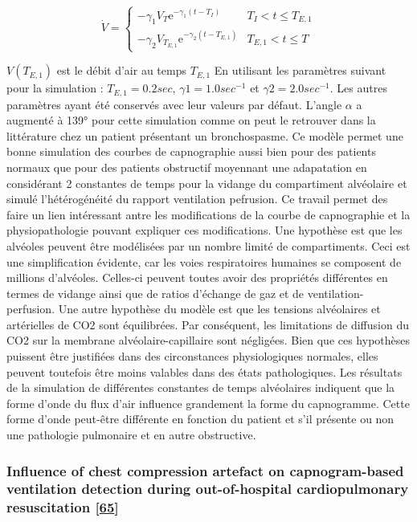 \documentclass[12pt,]{article}
\begin{document}
\[ 
 \dot{V} =     \left\{ \begin{array}{rcl}
         -\gamma_{1}V_{T}\mathrm{e}^{-\gamma_{1}(t-T_{I})} & T_{I}<t\leqslant T_{E,1}
         \\ -\gamma_{2}V_{T_{E,1}}\mathrm{e}^{-\gamma_{2}(t-T_{E,1})} & T_{E,1}<t\leqslant T
                \end{array}\right.
\]

\(V(T_{E,1})\) est le débit d'air au temps \(T_{E,1}\) En utilisant les
paramètres suivant pour la simulation : \(T_{E,1} = 0.2 sec\),
\(\gamma1= 1.0 sec^{-1}\) et \(\gamma2= 2.0 sec^{-1}\). Les autres
paramètres ayant été conservés avec leur valeurs par défaut. L'angle
\(\alpha\) a augmenté à 139° pour cette simulation comme on peut le
retrouver dans la littérature chez un patient présentant un
bronchospasme. Ce modèle permet une bonne simulation des courbes de
capnographie aussi bien pour des patients normaux que pour des patients
obstructif moyennant une adapatation en considérant 2 constantes de
temps pour la vidange du compartiment alvéolaire et simulé
l'hétérogénéité du rapport ventilation pefrusion. Ce travail permet des
faire un lien intéressant antre les modifications de la courbe de
capnographie et la physiopathologie pouvant expliquer ces modifications.
Une hypothèse est que les alvéoles peuvent être modélisées par un nombre
limité de compartiments. Ceci est une simplification évidente, car les
voies respiratoires humaines se composent de millions d'alvéoles.
Celles-ci peuvent toutes avoir des propriétés différentes en termes de
vidange ainsi que de ratios d'échange de gaz et de
ventilation-perfusion. Une autre hypothèse du modèle est que les
tensions alvéolaires et artérielles de CO2 sont équilibrées. Par
conséquent, les limitations de diffusion du CO2 sur la membrane
alvéolaire-capillaire sont négligées. Bien que ces hypothèses puissent
être justifiées dans des circonstances physiologiques normales, elles
peuvent toutefois être moins valables dans des états pathologiques. Les
résultats de la simulation de différentes constantes de temps
alvéolaires indiquent que la forme d'onde du flux d'air influence
grandement la forme du capnogramme. Cette forme d'onde peut-être
différente en fonction du patient et s'il présente ou non une pathologie
pulmonaire et en autre obstructive.

\hypertarget{influence-of-chest-compression-artefact-on-capnogram-based-ventilation-detection-during-out-of-hospital-cardiopulmonary-resuscitation-leturiondo2018influence}{%
\subsubsection{\texorpdfstring{Influence of chest compression artefact
on capnogram-based ventilation detection during out-of-hospital
cardiopulmonary resuscitation
{[}\protect\hyperlink{ref-leturiondo2018influence}{65}{]}}{Influence of chest compression artefact on capnogram-based ventilation detection during out-of-hospital cardiopulmonary resuscitation {[}65{]}}}\label{influence-of-chest-compression-artefact-on-capnogram-based-ventilation-detection-during-out-of-hospital-cardiopulmonary-resuscitation-leturiondo2018influence}}
\end{document}
